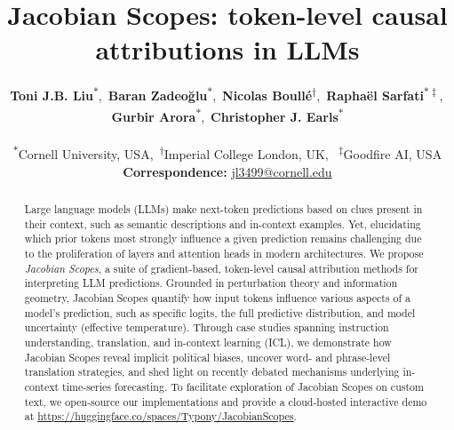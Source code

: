 \documentclass{article}
\title{Jacobian Scopes: token-level causal attributions in LLMs}
\author{%
  \textbf{Toni J.B. Liu}\textsuperscript{$*$},\,
  \textbf{Baran Zadeoğlu}\textsuperscript{$*$},\,
  \textbf{Nicolas Boullé}\textsuperscript{$\dagger$},\,
  \textbf{Raphaël Sarfati}\textsuperscript{$* \ddagger$},\,
  \\
  \textbf{Gurbir Arora}\textsuperscript{$*$},\,
  \textbf{Christopher J. Earls}\textsuperscript{$*$}
\\
\\
  \textsuperscript{$*$}Cornell University, USA,\,
  \textsuperscript{$\dagger$}Imperial College London, UK, \,
  \textsuperscript{$\ddagger$}Goodfire AI, USA
\\
  \small{
    \textbf{Correspondence:} \href{mailto:jl3499@cornell.edu}{jl3499@cornell.edu}
  }
}
\begin{document}
\maketitle
\begin{abstract}
Large language models (LLMs) make next-token predictions based on clues present in their
context, such as semantic descriptions and in-context examples. Yet, elucidating which prior
tokens most strongly influence a given prediction remains challenging due to the proliferation of layers and attention heads in modern
architectures. We propose \emph{Jacobian Scopes},
a suite of gradient-based, token-level causal
attribution methods for interpreting LLM predictions. Grounded in perturbation theory and
information geometry, Jacobian Scopes quantify how input tokens influence various aspects
of a model’s prediction, such as specific logits, the full predictive distribution, and model
uncertainty (effective temperature). Through
case studies spanning instruction understanding, translation, and in-context learning (ICL),
we demonstrate how Jacobian Scopes reveal
implicit political biases, uncover word- and
phrase-level translation strategies, and shed
light on recently debated mechanisms underlying in-context time-series forecasting.
To facilitate exploration of Jacobian Scopes on custom text, we open-source our implementations and provide a cloud-hosted interactive demo at \url{https://huggingface.co/spaces/Typony/JacobianScopes}.
\end{abstract}
\end{document}
